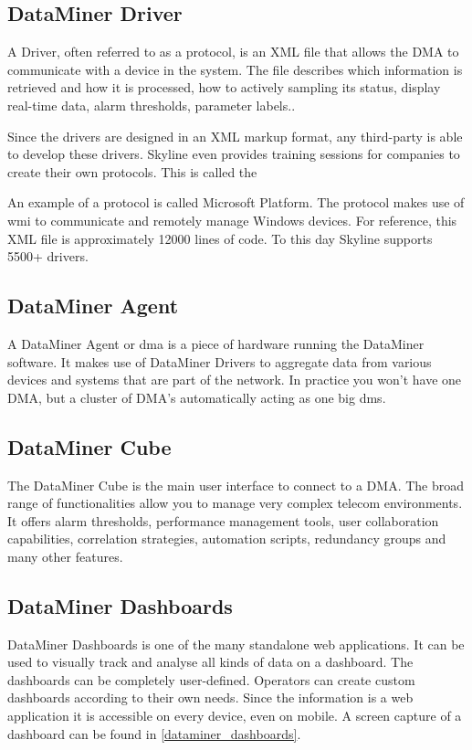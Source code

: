 \subsection{DataMiner Driver}
A Driver, often referred to as a protocol, is an XML file that allows the DMA to communicate with a device in the system. The file describes which information is retrieved and how it is processed, how to actively sampling its status, display real-time data, alarm thresholds, parameter labels..

Since the drivers are designed in an XML markup format, any third-party is able to develop these drivers. Skyline even provides training sessions for companies to create their own protocols. This is called the  

An example of a protocol is called Microsoft Platform. The protocol makes use of \gls{wmi} to communicate and remotely manage Windows devices. For reference, this XML file is approximately 12000 lines of code. To this day Skyline supports 5500+ drivers. 


\subsection{DataMiner Agent}

A DataMiner Agent or \gls{dma} is a piece of hardware running the DataMiner software. It makes use of DataMiner Drivers to aggregate data from various devices and systems that are part of the network. In practice you won't have one DMA, but a cluster of DMA's automatically acting as one big \gls{dms}.  

\subsection{DataMiner Cube}
The DataMiner Cube is the main user interface to connect to a DMA. The broad range of functionalities allow you to manage very complex telecom environments. It offers alarm thresholds, performance management tools, user collaboration capabilities, correlation strategies,  automation scripts, redundancy groups and many other features. 

\subsection{DataMiner Dashboards}\label{dataminer-dashboards-information}
 DataMiner Dashboards is one of the many standalone web applications.
 It can be used to visually track and analyse all kinds of data on a dashboard. The dashboards can be completely user-defined. Operators can create custom dashboards according to their own needs. Since the information is a web application it is accessible on every device, even on mobile. A screen capture of a dashboard can be found in \autoref{dataminer_dashboards}.
 
